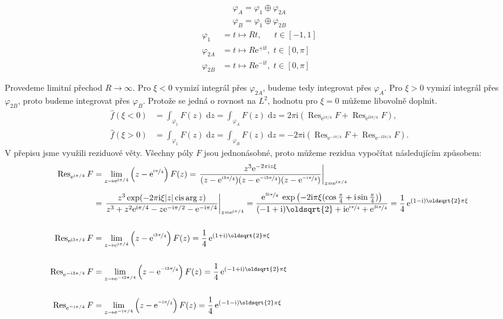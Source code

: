 \documentclass[10pt,a4paper]{article}
\def\ph{\phantom}
\newcommand{\const}[1]{\text{#1}}
\newcommand{\cis}{\operatorname{cis}}
\newcommand{\Res}{\operatorname{Res}}
\renewcommand{\d}[1]{\;\const{d}#1}
\newcommand{\e}[1]{\const{e}^{#1}}
\renewcommand{\i}{\const{i}}
\begin{document}
\begin{gather*}
    \varphi_A = \varphi_1 \oplus \varphi_{2A} \\
    \varphi_B = \varphi_1 \oplus \varphi_{2B}
\end{gather*}
\begin{align*}
    \varphi_{1\ph{A}} &= t \mapsto Rt, \; \ph{^+\i t} t \in [-1, 1] \\
    \varphi_{2A} &= t \mapsto R \e{+\i t}, \; t \in [0, \pi] \\
    \varphi_{2B} &= t \mapsto R \e{-\i t}, \; t \in [0, \pi]
\end{align*}

Provedeme limitní přechod $R\to\infty$. Pro $\xi < 0$ vymizí integrál přes $\varphi_{2A}$, budeme tedy integrovat přes $\varphi_A$. Pro $\xi > 0$ vymizí integrál přes $\varphi_{2B}$, proto budeme integrovat přes $\varphi_B$. Protože se jedná o rovnost na $L^2$, hodnotu pro $\xi=0$ můžeme libovolně doplnit.
\begin{align*}
    \hat{f}(\xi < 0)
    &= \int_{\varphi_1} F(z) \d{z}
    = \int_{\varphi_A} F(z) \d{z}
    = 2\pi\i \left( \Res_{\e{i\pi/4}} F + \Res_{\e{\i 3\pi/4}} F \right),
    \\[10pt]
    \hat{f}(\xi > 0)
    &= \int_{\varphi_1} F(z) \d{z}
    = \int_{\varphi_B} F(z) \d{z}
    = -2\pi\i \left( \Res_{\e{-i\pi/4}} F + \Res_{\e{-\i 3\pi/4}} F \right).
\end{align*}
V přepisu jsme využili reziduové věty. Všechny póly $F$ jsou jednonásobné, proto můžeme rezidua vypočítat následujícím způsobem:
\begin{align*}
    \Res_{\e{\i\pi/4}} F
    &= \lim_{z\to\e{\i\pi/4}} \left( z - \e{\nicefrac{\i\pi}{4}} \right) F(z)
    = \left. \frac{z^3 \e{-2\pi\i z\xi}}{(z-\e{\nicefrac{\i3\pi}{4}})(z-\e{\nicefrac{-\i3\pi}{4}})(z-\e{\nicefrac{-\i\pi}{4}})} \right|_{z=\e{\i\pi/4}}
    \\[5pt]
    &= \left. \frac{z^3 \exp(-2\pi\i\xi|z| \cis \arg z)}{z^3 + z^2 \e{\i\pi/4} - z\e{-\i\pi/2} - \e{-\i\pi/4}} \right|_{z=\e{\i\pi/4}}
    = \frac{
        \e{\nicefrac{3\i\pi}{4}} \; \exp \left(-2\i\pi\xi  (\cos \frac{\pi}{4} + \i \sin \frac{\pi}{4}) \right)
    }{
        (-1+\i)\oldsqrt{2} + \i\e{\nicefrac{\i\pi}{4}} + \e{\nicefrac{3\i\pi}{4}}
    }
    = \frac{1}{4} \, \e{(1-\i)\oldsqrt{2}\pi\xi}
    \\[15pt]
    \Res_{\e{\i3\pi/4}} F
    &= \lim_{z\to\e{\i\pi/4}} \left( z - \e{\nicefrac{\i3\pi}{4}} \right) F(z)
    = \frac{1}{4} \, \e{(1+\i)\oldsqrt{2}\pi\xi}
    \\[15pt]
    \Res_{\e{-\i3\pi/4}} F
    &= \lim_{z\to\e{-\i3\pi/4}} \left( z - \e{\nicefrac{-\i3\pi}{4}} \right) F(z)
    = \frac{1}{4} \, \e{(-1+\i)\oldsqrt{2}\pi\xi}
    \\[15pt]
    \Res_{\e{-\i\pi/4}} F
    &= \lim_{z\to\e{-\i\pi/4}} \left( z - \e{\nicefrac{-\i\pi}{4}} \right) F(z)
    = \frac{1}{4} \, \e{(-1-\i)\oldsqrt{2}\pi\xi}
\end{align*}
\end{document}
